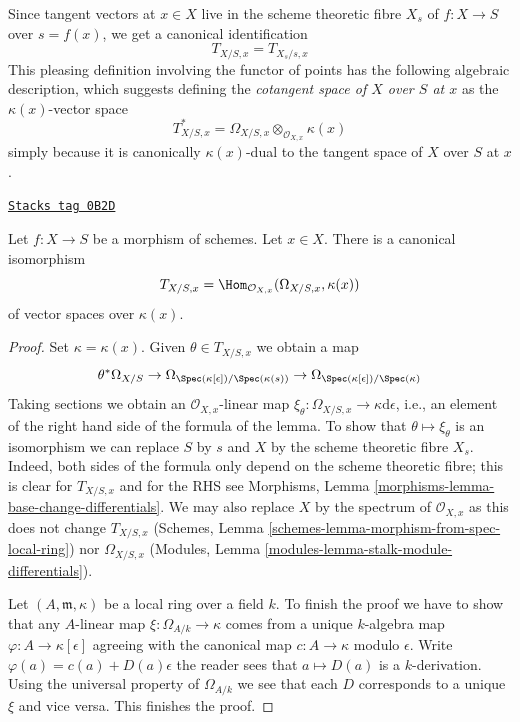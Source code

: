 Since tangent vectors at $x \in X$ live in the scheme theoretic fibre
$X_s$ of $f : X \to S$ over $s = f(x)$, we get a canonical identification
\begin{equation}
\label{equation-tangent-space-fibre}
T_{X/S, x} = T_{X_s/s, x}
\end{equation}
This pleasing definition involving the functor of points has the following
algebraic description, which suggests defining the
{\it cotangent space of $X$ over $S$ at $x$} as the $\kappa(x)$-vector
space
$$
T^*_{X/S, x} = \Omega_{X/S, x} \otimes_{\mathcal{O}_{X, x}} \kappa(x)
$$
simply because it is canonically $\kappa(x)$-dual to the tangent space of
$X$ over $S$ at $x$.

\begin{lemma}
\label{varieties-lemma-tangent-space-cotangent-space}
\href{https://stacks.math.columbia.edu/tag/0B2D}{\texttt{Stacks tag 0B2D}}

Let $f : X \to S$ be a morphism of schemes. Let $x \in X$.
There is a canonical isomorphism
$$
T_{X/S, x} = \Hom_{\mathcal{O}_{X, x}}(\Omega_{X/S, x}, \kappa(x))
$$
of vector spaces over $\kappa(x)$.
\end{lemma}

\begin{proof}
Set $\kappa = \kappa(x)$.
Given $\theta \in T_{X/S, x}$ we obtain a map
$$
\theta^*\Omega_{X/S} \to
\Omega_{\Spec(\kappa[\epsilon])/\Spec(\kappa(s))} \to
\Omega_{\Spec(\kappa[\epsilon])/\Spec(\kappa)}
$$
Taking sections we obtain an $\mathcal{O}_{X, x}$-linear map
$\xi_\theta : \Omega_{X/S, x} \to \kappa \text{d}\epsilon$, i.e.,
an element of the right hand side of the
formula of the lemma. To show that $\theta \mapsto \xi_\theta$ is
an isomorphism we can replace $S$ by $s$ and $X$ by the
scheme theoretic fibre $X_s$. Indeed, both sides of the
formula only depend on the scheme theoretic fibre;
this is clear for $T_{X/S, x}$ and for the RHS see
Morphisms, Lemma \ref{morphisms-lemma-base-change-differentials}.
We may also replace $X$ by the spectrum of $\mathcal{O}_{X, x}$
as this does not change $T_{X/S, x}$
(Schemes, Lemma \ref{schemes-lemma-morphism-from-spec-local-ring})
nor $\Omega_{X/S, x}$
(Modules, Lemma \ref{modules-lemma-stalk-module-differentials}).

\medskip\noindent
Let $(A, \mathfrak m, \kappa)$ be a local ring over a field $k$.
To finish the proof we have to show that any $A$-linear map
$\xi : \Omega_{A/k} \to \kappa$ comes from a unique $k$-algebra
map $\varphi : A \to \kappa[\epsilon]$ agreeing with the canonical
map $c : A \to \kappa$ modulo $\epsilon$. Write
$\varphi(a) = c(a) + D(a) \epsilon$
the reader sees that $a \mapsto D(a)$ is a $k$-derivation.
Using the universal property of $\Omega_{A/k}$ we see that each
$D$ corresponds to a unique $\xi$ and vice versa. This finishes the proof.
\end{proof}


